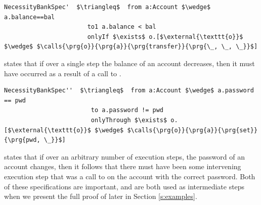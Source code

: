 \begin{lstlisting}[language = Chainmail, mathescape=true, frame=lines]
NecessityBankSpec'  $\triangleq$  from a:Account $\wedge$ a.balance==bal
                       to1 a.balance < bal
                       onlyIf $\exists$ o.[$\external{\texttt{o}}$ $\wedge$ $\calls{\prg{o}}{\prg{a}}{\prg{transfer}}{\prg{\_, \_, \_}}$]
\end{lstlisting}
 
 states that if over a single step the balance of an account decreases, then it must have occurred as 
a result of a call to .
 
\begin{lstlisting}[language = Chainmail, mathescape=true, frame=lines]
NecessityBankSpec''  $\triangleq$  from a:Account $\wedge$ a.password == pwd
                        to a.password != pwd
                        onlyThrough $\exists$ o.[$\external{\texttt{o}}$ $\wedge$ $\calls{\prg{o}}{\prg{a}}{\prg{set}}{\prg{pwd, \_}}$]
\end{lstlisting}
 
 states that if over an arbitrary number of execution steps, the password of an account changes,
then it follows that there must have been some intervening execution step that was a call to  on the account 
with the correct password. Both of these specifications are important, and are both used as intermediate steps
when we present the full proof of  later in Section \ref{s:examples}.

